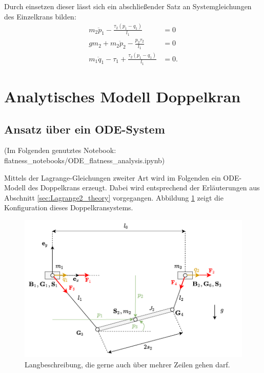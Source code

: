 Durch einsetzen dieser lässt sich ein abschließender Satz an Systemgleichungen des Einzelkrans bilden:
\begin{subequations}
	\begin{align}
		m_{2} \ddot{p}_{1} - \frac{\tau_{2} \left(p_{1} - q_{1}\right)}{l_{1}} &= 0 \label{single_flat_syseq1}\\
		g m_{2} + m_{2} \ddot{p}_{2} - \frac{p_{2} \tau_{2}}{l_{1}} &= 0\label{single_flat_syseq2}\\
		m_{1} \ddot{q}_{1} - \tau_{1} + \frac{\tau_{2} \left(p_{1} - q_{1}\right)}{l_{1}} &= 0\label{single_flat_syseq3}.
	\end{align}
\end{subequations}


\section{Analytisches Modell Doppelkran}

\subsection{Ansatz über ein ODE-System}
(Im Folgenden genutztes Notebook: flatness\_notebooks/ODE\_flatness\_analysis.ipynb)

Mittels der Lagrange-Gleichungen zweiter Art wird im Folgenden ein ODE-Modell des Doppelkrans erzeugt. Dabei wird entsprechend der Erläuterungen aus Abschnitt \ref{sec:Lagrange2_theory} vorgegangen. Abbildung \ref{fig:double_crane_diagram} zeigt die Konfiguration dieses Doppelkransystems.

\begin{figure}[ht]
	\begin{center}
		\includegraphics[scale=1]{Pictures/ODE_flatness_analysis_double_crane_diagram}
	\end{center}
	\caption[Kurzbeschreibung für Abbildungsverzeichnis]
	{Langbeschreibung, die gerne auch über mehrer Zeilen gehen darf.}
	\label{fig:double_crane_diagram}
\end{figure}


